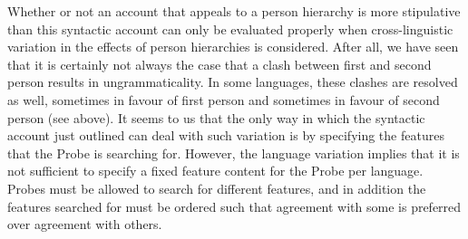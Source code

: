 \documentclass[output=paper]{langsci/langscibook}
\begin{document}
  Whether or not an account that appeals to a person hierarchy is more stipulative than this syntactic account can only be evaluated properly when cross-linguistic variation in the effects of person hierarchies is considered. After all, we have seen that it is certainly not always the case that a clash between first and second person results in ungrammaticality. In some languages, these clashes are resolved as well, sometimes in favour of first person and sometimes in favour of second person (see above). It seems to us that the only way in which the syntactic account just outlined can deal with such variation is by specifying the features that the Probe is searching for. However, the language variation implies that it is not sufficient to specify a fixed feature content for the Probe per language. Probes must be allowed to search for different features, and in addition the features searched for must be ordered such that agreement with some is preferred over agreement with others.
\end{document}
